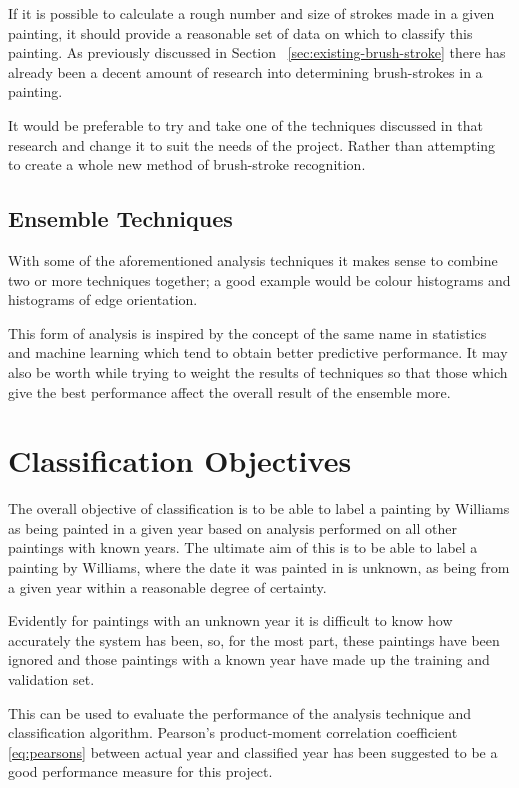 If it is possible to calculate a rough number and size of strokes made in a given painting, it
should provide a reasonable set of data on which to classify this painting. As previously discussed in Section~
\ref{sec:existing-brush-stroke} there has already been a decent amount of research into determining
brush-strokes in a painting. 

It would be preferable to try and take one of the techniques discussed in that research and change
it to suit the needs of the project. Rather than attempting to create a whole new method of 
brush-stroke recognition.

\subsection{Ensemble Techniques}
With some of the aforementioned analysis techniques it makes sense to combine two or more 
techniques together; a good example would be colour histograms and histograms of edge orientation.

This form of analysis is inspired by the concept of the same name in statistics and machine 
learning which tend to obtain better predictive performance. It may also be worth while trying to
weight the results of techniques so that those which give the best performance affect the overall 
result of the ensemble more.


\section{Classification Objectives}
The overall objective of classification is to be able to label a painting by Williams as 
being painted in a given year based on analysis performed on all other paintings with known years.
The ultimate aim of this is to be able to label a painting by Williams, where the date it was
painted in is unknown, as being from a given year within a reasonable degree of certainty.

Evidently for 
paintings with an unknown year it is difficult to know how accurately the system has been, so, for
the most part, these paintings have been ignored and those paintings with a known year have made
up the training and validation set.

This can be used to evaluate the performance of the analysis technique and classification 
algorithm. Pearson's product-moment correlation coefficient \eqref{eq:pearsons} between actual year
and classified year has been suggested to be a good performance measure for this project.

